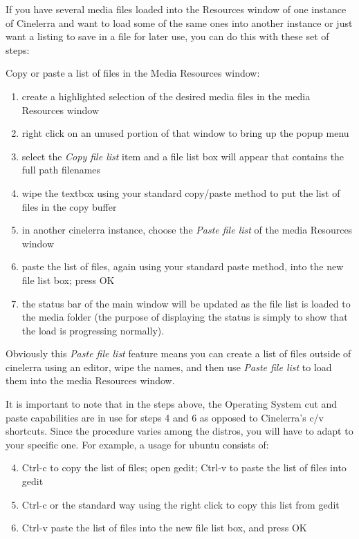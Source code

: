 If you have several media files loaded into the Resources window of one instance of Cinelerra and want to load some of the same ones into another instance or just want a listing to save in a file for later use, you can do this with these set of steps:

Copy or paste a list of files in the Media Resources window:  


\begin{enumerate}
    \item  create a highlighted selection of the desired media files in the media Resources window
    \item    right click on an unused portion of that window to bring up the popup menu
    \item     select the \textit{Copy file list} item and a file list box will appear that contains the full path filenames
    \item     wipe the textbox using your standard copy/paste method to put the list of files in the copy buffer
    \item     in another cinelerra instance, choose the \textit{Paste file list} of the media Resources window
    \item     paste the list of files, again using your standard paste method, into the new file list box; press OK
    \item    the status bar of the main window will be updated as the file list is loaded to the media folder (the purpose of displaying the status is simply to show that the load is progressing normally).
\end{enumerate}

Obviously this \textit{Paste file list} feature means you can create a list of files outside of cinelerra using an editor, wipe the names, and then use \textit{Paste file list} to load them into the media Resources window.  

It is important to note that in the steps above, the Operating System cut and paste capabilities are in use for steps 4 and 6 as opposed to Cinelerra’s c/v shortcuts.  
Since the procedure varies among the distros, you will have to adapt to your specific one.  For example, a usage for ubuntu consists of:
\begin{enumerate}
    \setcounter{enumi}{3}
    \item   Ctrl-c to copy the list of files; open gedit; Ctrl-v to paste the list of files into gedit
    \item   Ctrl-c or the standard way using the right click to copy this list from gedit
    \item Ctrl-v paste the list of files into the new file list box, and press OK
\end{enumerate}

